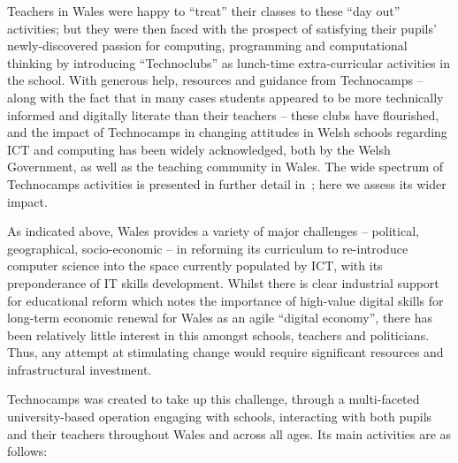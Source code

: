 Teachers in Wales were happy to ``treat'' their classes to these ``day
out'' activities; but they were then faced with the prospect of
satisfying their pupils' newly-discovered passion for computing,
programming and computational thinking by introducing ``Technoclubs''
as lunch-time extra-curricular activities in the school.  With
generous help, resources and guidance from Technocamps -- along with
the fact that in many cases students appeared to be more technically
informed and digitally literate than their teachers -- these clubs
have flourished, and the impact of Technocamps in changing attitudes
in Welsh schools regarding ICT and computing has been widely
acknowledged, both by the Welsh Government, as well as the teaching
community in Wales.  The wide spectrum of Technocamps activities is
presented in further detail in~\cite{crick+moller-wipsce2015}; here we
assess its wider impact.

As indicated above, Wales provides a variety of major challenges --
political, geographical, socio-economic -- in reforming its curriculum
to re-introduce computer science into the space currently populated by
ICT, with its preponderance of IT skills development.  Whilst there is
clear industrial support for educational reform which notes the
importance of high-value digital skills for long-term economic renewal
for Wales as an agile ``digital economy'', there has been relatively
little interest in this amongst schools, teachers and politicians.
Thus, any attempt at stimulating change would require significant
resources and infrastructural investment.

Technocamps was created to take up this challenge, through a
multi-faceted university-based operation engaging with schools,
interacting with both pupils and their teachers throughout Wales and
across all ages. Its main activities are as follows:

